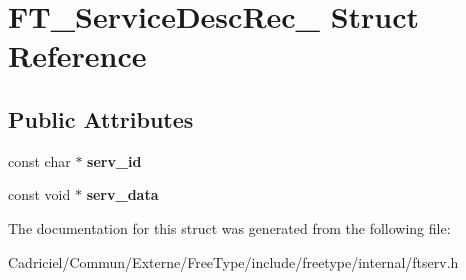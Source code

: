 \hypertarget{struct_f_t___service_desc_rec__}{}\section{F\+T\+\_\+\+Service\+Desc\+Rec\+\_\+ Struct Reference}
\label{struct_f_t___service_desc_rec__}
\subsection*{Public Attributes}
\begin{DoxyCompactItemize}
\item 
const char $\ast$ {\bfseries serv\+\_\+id}\hypertarget{struct_f_t___service_desc_rec___ab706270db01e1398233571f10bd249d4}{}\label{struct_f_t___service_desc_rec___ab706270db01e1398233571f10bd249d4}

\item 
const void $\ast$ {\bfseries serv\+\_\+data}\hypertarget{struct_f_t___service_desc_rec___aa597a33a2b0d099ec32882dc6aa38d59}{}\label{struct_f_t___service_desc_rec___aa597a33a2b0d099ec32882dc6aa38d59}

\end{DoxyCompactItemize}


The documentation for this struct was generated from the following file\+:\begin{DoxyCompactItemize}
\item 
Cadriciel/\+Commun/\+Externe/\+Free\+Type/include/freetype/internal/ftserv.\+h\end{DoxyCompactItemize}
